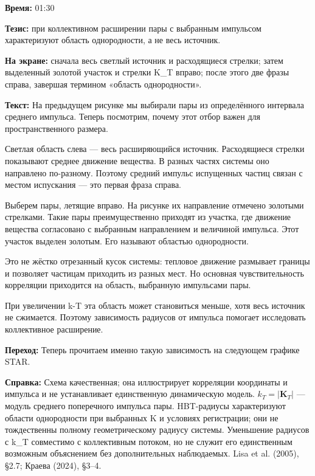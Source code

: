 \textbf{Время:} 01:30

\textbf{Тезис:} при коллективном расширении пары с выбранным импульсом характеризуют область однородности, а не весь источник.

\textbf{На экране:} сначала весь светлый источник и расходящиеся стрелки; затем выделенный золотой участок и стрелки K\_T вправо; после этого две фразы справа, завершая термином «область однородности».

\textbf{Текст:} На предыдущем рисунке мы выбирали пары из определённого интервала среднего импульса. Теперь посмотрим, почему этот отбор важен для пространственного размера.

Светлая область слева — весь расширяющийся источник. Расходящиеся стрелки показывают среднее движение вещества. В разных частях системы оно направлено по-разному. Поэтому средний импульс испущенных частиц связан с местом испускания — это первая фраза справа.

Выберем пары, летящие вправо. На рисунке их направление отмечено золотыми стрелками. Такие пары преимущественно приходят из участка, где движение вещества согласовано с выбранным направлением и величиной импульса. Этот участок выделен золотым. Его называют областью однородности.

Это не жёстко отрезанный кусок системы: тепловое движение размывает границы и позволяет частицам приходить из разных мест. Но основная чувствительность корреляции приходится на область, выбранную импульсами пары.

При увеличении k-T эта область может становиться меньше, хотя весь источник не сжимается. Поэтому зависимость радиусов от импульса помогает исследовать коллективное расширение.

\textbf{Переход:} Теперь прочитаем именно такую зависимость на следующем графике STAR.

\textbf{Справка:} Схема качественная; она иллюстрирует корреляции координаты и импульса и не устанавливает единственную динамическую модель. \(k_T=|\mathbf K_T|\) — модуль среднего поперечного импульса пары. HBT-радиусы характеризуют области однородности при выбранных K и условиях регистрации; они не тождественны полному геометрическому радиусу системы. Уменьшение радиусов с k\_T совместимо с коллективным потоком, но не служит его единственным возможным объяснением без дополнительных наблюдаемых. Lisa et al. (2005), §2.7; Краева (2024), §3–4.
